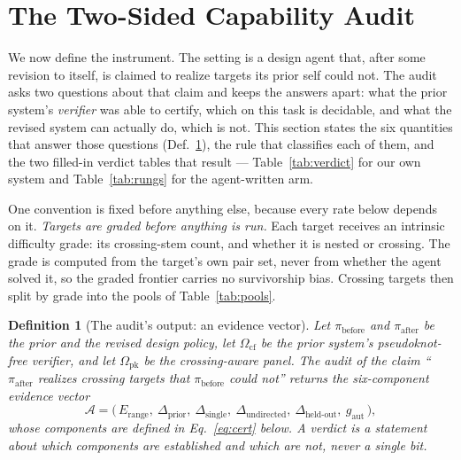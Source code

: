 \documentclass[11pt]{article}
\newtheorem{definition}{Definition}
\newcommand{\Ocf}{\ensuremath{\Omega_{\mathrm{cf}}}}
\newcommand{\Opk}{\ensuremath{\Omega_{\mathrm{pk}}}}
\begin{document}
\section{The Two-Sided Capability Audit}\label{sec:cert}
We now define the instrument. The setting is a design agent that, after some revision to itself, is claimed to
realize targets its prior self could not. The audit asks two questions about that claim and keeps the answers
apart: what the prior system's \emph{verifier} was able to certify, which on this task is decidable, and what
the revised system can actually do, which is not. This section states the six quantities that answer those
questions (Def.~\ref{def:cert}), the rule that classifies each of them, and the two filled-in verdict tables
that result --- Table~\ref{tab:verdict} for our own system and Table~\ref{tab:rungs} for the agent-written arm.

One convention is fixed before anything else, because every rate below depends on it. \emph{Targets are graded
before anything is run.} Each target receives an intrinsic difficulty grade: its crossing-stem count, and whether it is nested or
crossing. The grade is computed from the target's own pair set, never from whether the agent solved it, so the
graded frontier carries no survivorship bias. Crossing targets then split by grade into the
pools of Table~\ref{tab:pools}.

\begin{definition}[The audit's output: an evidence vector]\label{def:cert}
Let $\pi_{\mathrm{before}}$ and $\pi_{\mathrm{after}}$ be the prior and the revised design policy, let $\Ocf$
be the prior system's pseudoknot-free verifier, and let $\Opk$ be the crossing-aware panel. The audit of the
claim ``$\pi_{\mathrm{after}}$ realizes crossing targets that $\pi_{\mathrm{before}}$ could not'' returns the
six-component \emph{evidence vector}
\begin{equation}\label{eq:vector}
  \mathcal A=\bigl(\,E_{\mathrm{range}},\ \Delta_{\mathrm{prior}},\ \Delta_{\mathrm{single}},\
  \Delta_{\mathrm{undirected}},\ \Delta_{\mathrm{held\text{-}out}},\ g_{\mathrm{aut}}\,\bigr),
\end{equation}
whose components are defined in Eq.~\eqref{eq:cert} below. A verdict is a statement about which components are
established and which are not, never a single bit.
\end{definition}
\end{document}
